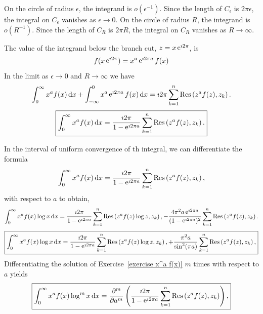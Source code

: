 {\begin{Solution}
  On the circle of radius $\epsilon$, the integrand is
  $o( \epsilon^{-1} )$.  Since the length of $C_\epsilon$
  is $2 \pi \epsilon$, the integral on $C_\epsilon$ vanishes as
  $\epsilon \to 0$.
  On the circle of radius $R$, the integrand is
  $o( R^{-1} )$.  Since the length of $C_R$ is
  $2 \pi R$, the integral on $C_R$ vanishes as $R \to \infty$.

  The value of the integrand below the branch cut, $z = x \mathop{\mathrm{e}}\nolimits^{\imath 2 \pi}$, is
  \[
  f(x \mathop{\mathrm{e}}\nolimits^{\imath 2 \pi}) = x^a \mathop{\mathrm{e}}\nolimits^{\imath 2 \pi a} f(x)
  \]
  In the limit as $\epsilon \to 0$ and $R \to \infty$ we have
  \[
  \int_0^\infty x^a f(x) \,\mathrm{d} x
  + \int_{-\infty}^0 x^a \mathop{\mathrm{e}}\nolimits^{\imath 2 \pi a} f(x) \,\mathrm{d} x
  = \imath 2 \pi \sum_{k=1}^n \mathop{\mathrm{Res}}\nolimits \left( z^a f(z), z_k \right).
  \]
  \[
  \boxed{
    \int_0^\infty x^a f(x) \,\mathrm{d} x
    = \frac{ \imath 2 \pi }{ 1 - \mathop{\mathrm{e}}\nolimits^{\imath 2 \pi a} }
    \sum_{k=1}^n \mathop{\mathrm{Res}}\nolimits \left( z^a f(z), z_k \right).
    }
  \]
\end{Solution}



\begin{Solution}
  \label{solution x^a f(x) log x}
  In the interval of uniform convergence of th integral, we can differentiate 
  the formula
  \[
  \int_0^\infty x^a f(x) \,\mathrm{d} x
  = \frac{ \imath 2 \pi }{ 1 - \mathop{\mathrm{e}}\nolimits^{\imath 2 \pi a} }
  \sum_{k=1}^n \mathop{\mathrm{Res}}\nolimits \left( z^a f(z), z_k \right),
  \]
  with respect to $a$ to obtain,
  \[
  \int_0^\infty x^a f(x) \log x \,\mathrm{d} x
  = \frac{ \imath 2 \pi }{ 1 - \mathop{\mathrm{e}}\nolimits^{\imath 2 \pi a} }
  \sum_{k=1}^n \mathop{\mathrm{Res}}\nolimits \left( z^a f(z) \log z, z_k \right),
  - \frac{ 4 \pi^2 a \mathop{\mathrm{e}}\nolimits^{\imath 2 \pi a} }{ (1 - \mathop{\mathrm{e}}\nolimits^{\imath 2 \pi a})^2 }
  \sum_{k=1}^n \mathop{\mathrm{Res}}\nolimits \left( z^a f(z), z_k \right).
  \]
  \[
  \boxed{
    \int_0^\infty x^a f(x) \log x \,\mathrm{d} x
    = \frac{ \imath 2 \pi }{ 1 - \mathop{\mathrm{e}}\nolimits^{\imath 2 \pi a} }
    \sum_{k=1}^n \mathop{\mathrm{Res}}\nolimits \left( z^a f(z) \log z, z_k \right),
    + \frac{ \pi^2 a }{ \sin^2 (\pi a) }
    \sum_{k=1}^n \mathop{\mathrm{Res}}\nolimits \left( z^a f(z), z_k \right),
    }
  \]
  Differentiating the solution of Exercise~\ref{exercise x^a f(x)} $m$ times with
  respect to $a$ yields
  \[
  \boxed{
    \int_0^\infty x^a f(x) \log^m x\,\mathrm{d} x
    = \frac{\partial^m}{\partial a^m} \left(\frac{ \imath 2 \pi }{ 1 - \mathop{\mathrm{e}}\nolimits^{\imath 2 \pi a} }
      \sum_{k=1}^n \mathop{\mathrm{Res}}\nolimits \left( z^a f(z), z_k \right) \right),
    }
  \]
\end{Solution}



}
